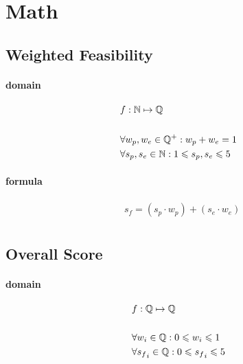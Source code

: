 \chapter{Math}\label{ax:math}

\section{Weighted Feasibility}\label{ax:math:feasibility}

\subsubsection{domain}

\begin{align*}
    &f: \mathbb{N} \mapsto \mathbb{Q} \\
    \\
    &\forall w_p,w_e \in \mathbb{Q}^+: w_p + w_e = 1 \\
    &\forall s_p,s_e \in \mathbb{N}: 1 \leqslant s_p,s_e \leqslant 5 \\
\end{align*}

\subsubsection{formula}

\begin{align*}
    &s_f = (s_p \cdot w_p) + (s_e \cdot w_e) \\
\end{align*}

\section{Overall Score}\label{ax:math:mean}

\subsubsection{domain}

\begin{align*}
    &f: \mathbb{Q} \mapsto \mathbb{Q} \\
    \\
    &\forall w_i \in \mathbb{Q}:0 \leqslant w_i \leqslant 1 \\
    &\forall {s_f}_i \in \mathbb{Q}:0 \leqslant {s_f}_i \leqslant 5 \\
\end{align*}

